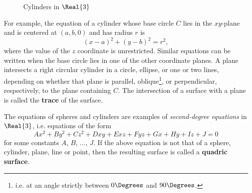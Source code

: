 \begin{figure}[h]
{\begin{tikzpicture}
 \end{tikzpicture}}
 \qquad\qquad
 \caption[]{\quad Cylinders in $\Real{3}$}
 \label{fig:cyls}
\end{figure}

For example, the equation of a cylinder whose base circle $C$ lies in the $xy$-plane and is centered at $(a,b,0)$ and
has radius $r$ is
\begin{equation}\label{eqn:cylxy}
 (x - a)^2 + (y - b)^2 = r^2,
\end{equation}
where the value of the $z$ coordinate is unrestricted. Similar equations can be written when the base circle
lies in one of the other coordinate planes.
A plane intersects a right circular cylinder in a circle, ellipse, or one or two lines,
depending on whether that plane is parallel, oblique\footnote{i.e. at an angle strictly between $0\Degrees$ and
$90\Degrees$.}, or perpendicular, respectively, to the plane containing $C$.
The intersection of a surface with a plane is called the \textbf{trace} of the surface.

The equations of spheres and cylinders are examples of \emph{second-degree equations}
in $\Real{3}$, i.e. equations of the form
\begin{equation}\label{eqn:quadric}
 Ax^2 + By^2 + Cz^2 + Dxy + Exz + Fyz + Gx + Hy + Iz + J = 0
\end{equation}
for some constants $A$, $B$, $\dots$, $J$. If the above equation is
not that of a sphere, cylinder, plane, line or point, then the resulting surface is called a
\textbf{quadric surface}.

